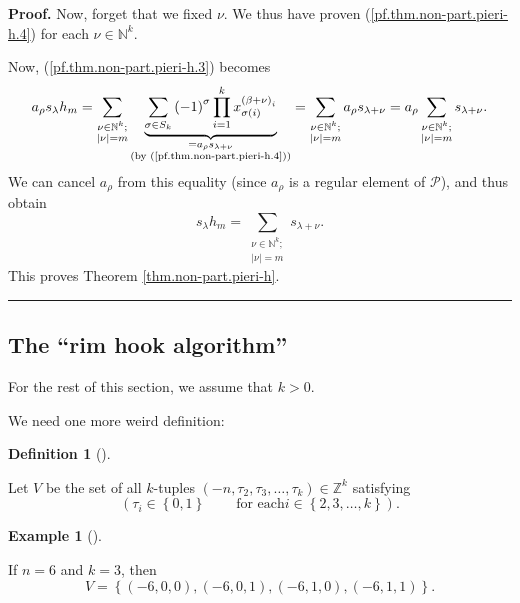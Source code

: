 \documentclass[numbers=enddot,12pt,final,onecolumn,notitlepage]{scrartcl}%
\theoremstyle{definition}
\newtheorem{defi}[theo]{Definition}
\newenvironment{definition}[1][]
{\begin{defi}[#1]\begin{leftbar}}
{\end{leftbar}\end{defi}}
\newtheorem{exmp}[theo]{Example}
\newenvironment{example}[1][]
{\begin{exmp}[#1]\begin{leftbar}}
{\end{leftbar}\end{exmp}}
\newenvironment{proof}[1][Proof]{\noindent\textbf{#1.} }{\ \rule{0.5em}{0.5em}}
\let\sumnonlimits\sum
\let\prodnonlimits\prod
\renewcommand{\sum}{\sumnonlimits\limits}
\renewcommand{\prod}{\prodnonlimits\limits}
\begin{document}
\begin{proof}
Now, forget that we fixed $\nu$. We thus have proven
(\ref{pf.thm.non-part.pieri-h.4}) for each $\nu\in\mathbb{N}^{k}$.

Now, (\ref{pf.thm.non-part.pieri-h.3}) becomes%
\[
a_{\rho}s_{\lambda}h_{m}=\sum_{\substack{\nu\in\mathbb{N}^{k};\\\left\vert
\nu\right\vert =m}}\underbrace{\sum_{\sigma\in S_{k}}\left(  -1\right)
^{\sigma}\prod_{i=1}^{k}x_{\sigma\left(  i\right)  }^{\left(  \beta
+\nu\right)  _{i}}}_{\substack{=a_{\rho}s_{\lambda+\nu}\\\text{(by
(\ref{pf.thm.non-part.pieri-h.4}))}}}=\sum_{\substack{\nu\in\mathbb{N}%
^{k};\\\left\vert \nu\right\vert =m}}a_{\rho}s_{\lambda+\nu}=a_{\rho}%
\sum_{\substack{\nu\in\mathbb{N}^{k};\\\left\vert \nu\right\vert
=m}}s_{\lambda+\nu}.
\]
We can cancel $a_{\rho}$ from this equality (since $a_{\rho}$ is a regular
element of $\mathcal{P}$), and thus obtain%
\[
s_{\lambda}h_{m}=\sum_{\substack{\nu\in\mathbb{N}^{k};\\\left\vert
\nu\right\vert =m}}s_{\lambda+\nu}.
\]
This proves Theorem \ref{thm.non-part.pieri-h}.
\end{proof}

\subsection{The \textquotedblleft rim hook algorithm\textquotedblright}

For the rest of this section, we assume that $k>0$.

We need one more weird definition:

\begin{definition}
\label{def.rimhook.V}Let $V$ be the set of all $k$-tuples $\left(  -n,\tau
_{2},\tau_{3},\ldots,\tau_{k}\right)  \in\mathbb{Z}^{k}$ satisfying%
\begin{equation}
\left(  \tau_{i}\in\left\{  0,1\right\}  \ \ \ \ \ \ \ \ \ \ \text{for each
}i\in\left\{  2,3,\ldots,k\right\}  \right)  . \label{eq.def.rimhook.V.cond}%
\end{equation}

\end{definition}

\begin{example}
\label{exa.rimhook.V}If $n=6$ and $k=3$, then%
\begin{equation}
V=\left\{  \left(  -6,0,0\right)  ,\left(  -6,0,1\right)  ,\left(
-6,1,0\right)  ,\left(  -6,1,1\right)  \right\}  . \label{eq.exa.rimhook.V.63}%
\end{equation}

\end{example}
\end{document}
